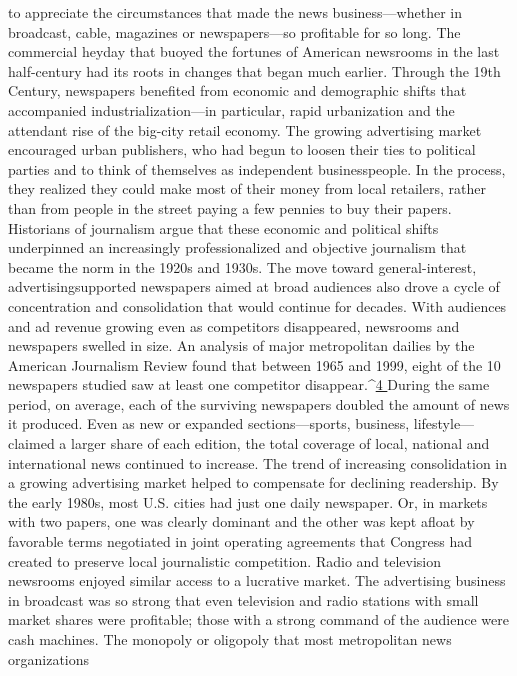 to appreciate the circumstances that made the news business—whether
in broadcast, cable, magazines or newspapers—so profitable for so long. The
commercial heyday that buoyed the fortunes of American newsrooms in the last
half-century had its roots in changes that began much earlier.
Through the 19th Century, newspapers benefited from economic and demographic
shifts that accompanied industrialization—in particular, rapid urbanization
and the attendant rise of the big-city retail economy. The growing advertising
market encouraged urban publishers, who had begun to loosen their ties to
political parties and to think of themselves as independent businesspeople. In the
process, they realized they could make most of their money from local retailers,
rather than from people in the street paying a few pennies to buy their papers.
Historians of journalism argue that these economic and political shifts underpinned
an increasingly professionalized and objective journalism that became the
norm in the 1920s and 1930s. The move toward general-interest, advertisingsupported
newspapers aimed at broad audiences also drove a cycle of concentration
and consolidation that would continue for decades.
With audiences and ad revenue growing even as competitors disappeared,
newsrooms and newspapers swelled in size. An analysis of major metropolitan
dailies by the American Journalism Review found that between 1965 and 1999,
eight of the 10 newspapers studied saw at least one competitor disappear.^{\href{#endnotes-ch1}{4 }}During
the same period, on average, each of the surviving newspapers doubled the
amount of news it produced. Even as new or expanded sections—sports, business,
lifestyle—claimed a larger share of each edition, the total coverage of local,
national and international news continued to increase.
The trend of increasing consolidation in a growing advertising market helped
to compensate for declining readership. By the early 1980s, most U.S. cities had
just one daily newspaper. Or, in markets with two papers, one was clearly dominant
and the other was kept afloat by favorable terms negotiated in joint operating
agreements that Congress had created to preserve local journalistic competition.
Radio and television newsrooms enjoyed similar access to a lucrative
market. The advertising business in broadcast was so strong that even television
and radio stations with small market shares were profitable; those with a strong
command of the audience were cash machines.
The monopoly or oligopoly that most metropolitan news organizations

